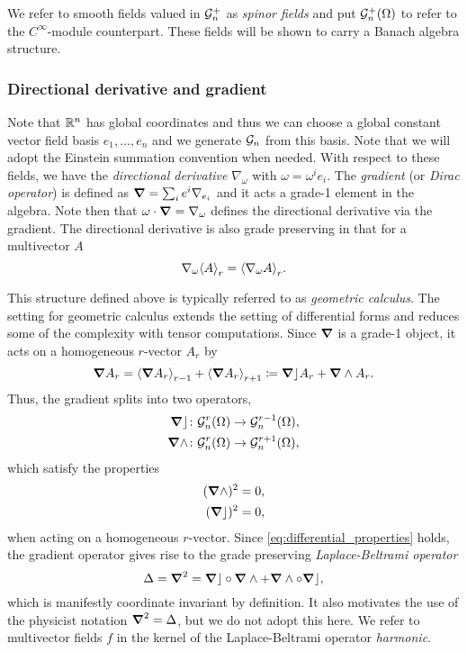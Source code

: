 We refer to smooth fields valued in $\G_n^+$ as \emph{spinor fields} and put $\G_n^+(\Omega)$ to refer to the $C^\infty$-module counterpart. These fields will be shown to carry a Banach algebra structure. 


\subsubsection{Directional derivative and gradient}

Note that $\R^n$ has global coordinates and thus we can choose a global constant vector field basis $e_1,\dots,e_n$ and we generate $\G_n$ from this basis. Note that we will adopt the Einstein summation convention when needed. With respect to these fields, we have the \emph{directional derivative} $\nabla_\omega$ with $\omega = \omega^i e_i$. The \emph{gradient} (or \emph{Dirac operator}) is defined as $\grad = \sum_{i} e^i \nabla_{e_i}$ and it acts a grade-1 element in the algebra.   Note then that $\omega \cdot \grad = \nabla_\omega$ defines the directional derivative via the gradient. The directional derivative is also grade preserving in that for a multivector $A$
\begin{equation}
\nabla_\omega \proj{r}{A} = \proj{r}{\nabla_\omega A}.
\end{equation}

This structure defined above is typically referred to as \emph{geometric calculus}.  The setting for geometric calculus extends the setting of differential forms and reduces some of the complexity with tensor computations.  Since $\grad$ is a grade-1 object, it acts on a homogeneous $r$-vector $A_r$ by
\begin{equation}
\grad A_r = \proj{r-1}{\grad A_r} + \proj{r+1}{\grad A_r} \coloneqq \grad \rfloor A_r + \grad \wedge A_r.
\end{equation}
Thus, the gradient splits into two operators, 
\begin{align}
\grad \rfloor &\colon \G_n^r(\Omega) \to \G_n^{r-1}(\Omega), \\
\grad \wedge &\colon \G_n^r(\Omega) \to \G_n^{r+1}(\Omega),
\end{align}
which satisfy the properties
\begin{align}
\label{eq:differential_properties}
(\grad \wedge)^2=0,\\
(\grad \rfloor)^2 = 0,
\end{align}
when acting on a homogeneous $r$-vector. Since \ref{eq:differential_properties} holds, the gradient operator gives rise to the grade preserving \emph{Laplace-Beltrami operator}
\[
\Delta = \grad^2 = \grad \rfloor \circ \grad \wedge + \grad \wedge \circ \grad \rfloor,
\]
which is manifestly coordinate invariant by definition.  It also motivates the use of the physicist notation $\grad^2=\Delta$, but we do not adopt this here.  We refer to multivector fields $f$ in the kernel of the Laplace-Beltrami operator \emph{harmonic}.

